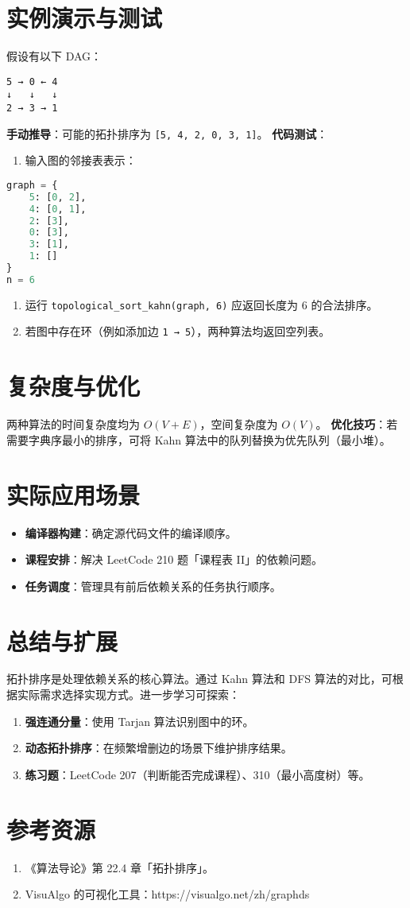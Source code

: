\chapter{实例演示与测试}
假设有以下 DAG：\par
\begin{lstlisting}
5 → 0 ← 4
↓   ↓   ↓
2 → 3 → 1
\end{lstlisting}
\textbf{手动推导}：可能的拓扑排序为 \verb![5, 4, 2, 0, 3, 1]!。
\textbf{代码测试}：\par
\begin{enumerate}
\item 输入图的邻接表表示：
\end{enumerate}
\begin{lstlisting}[language=python]
graph = {
    5: [0, 2],
    4: [0, 1],
    2: [3],
    0: [3],
    3: [1],
    1: []
}
n = 6
\end{lstlisting}
\begin{enumerate}
\item 运行 \verb!topological_sort_kahn(graph, 6)! 应返回长度为 6 的合法排序。
\item 若图中存在环（例如添加边 \verb!1 → 5!），两种算法均返回空列表。
\end{enumerate}
\chapter{复杂度与优化}
两种算法的时间复杂度均为 $O(V + E)$，空间复杂度为 $O(V)$。
\textbf{优化技巧}：若需要字典序最小的排序，可将 Kahn 算法中的队列替换为优先队列（最小堆）。\par
\chapter{实际应用场景}
\begin{itemize}
\item \textbf{编译器构建}：确定源代码文件的编译顺序。
\item \textbf{课程安排}：解决 LeetCode 210 题「课程表 II」的依赖问题。
\item \textbf{任务调度}：管理具有前后依赖关系的任务执行顺序。
\end{itemize}
\chapter{总结与扩展}
拓扑排序是处理依赖关系的核心算法。通过 Kahn 算法和 DFS 算法的对比，可根据实际需求选择实现方式。进一步学习可探索：\par
\begin{enumerate}
\item \textbf{强连通分量}：使用 Tarjan 算法识别图中的环。
\item \textbf{动态拓扑排序}：在频繁增删边的场景下维护排序结果。
\item \textbf{练习题}：LeetCode 207（判断能否完成课程）、310（最小高度树）等。
\end{enumerate}
\chapter{参考资源}
\begin{enumerate}
\item 《算法导论》第 22.4 章「拓扑排序」。
\item VisuAlgo 的可视化工具：https://visualgo.net/zh/graphds
\end{enumerate}
